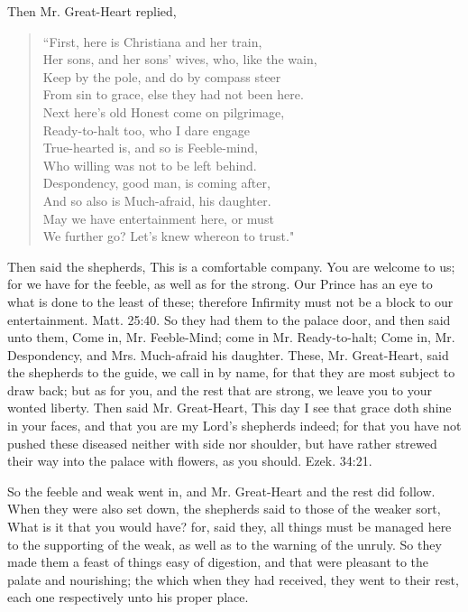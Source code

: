 Then Mr. Great-Heart replied,
\begin{verse}
``First, here is Christiana and her train,\\
Her sons, and her sons' wives, who, like the wain,\\
Keep by the pole, and do by compass steer\\
From sin to grace, else they had not been here.\\
Next here's old Honest come on pilgrimage,\\
Ready-to-halt too, who I dare engage\\
True-hearted is, and so is Feeble-mind,\\
Who willing was not to be left behind.\\
Despondency, good man, is coming after,\\
And so also is Much-afraid, his daughter.\\
May we have entertainment here, or must\\
We further go? Let's knew whereon to trust."\\
\end{verse}

Then said the shepherds, This is a comfortable company. You are welcome to us; for we have for the feeble, as well as for the strong. Our Prince has an eye to what is done to the least of these; therefore Infirmity must not be a block to our entertainment. Matt. 25:40. So they had them to the palace door, and then said unto them, Come in, Mr. Feeble-Mind; come in Mr. Ready-to-halt; Come in, Mr. Despondency, and Mrs. Much-afraid his daughter. These, Mr. Great-Heart, said the shepherds to the guide, we call in by name, for that they are most subject to draw back; but as for you, and the rest that are strong, we leave you to your wonted liberty. Then said Mr. Great-Heart, This day I see that grace doth shine in your faces, and that you are my Lord's shepherds indeed; for that you have not pushed these diseased neither with side nor shoulder, but have rather strewed their way into the palace with flowers, as you should. Ezek. 34:21.

So the feeble and weak went in, and Mr. Great-Heart and the rest did follow. When they were also set down, the shepherds said to those of the weaker sort, What is it that you would have? for, said they, all things must be managed here to the supporting of the weak, as well as to the warning of the unruly. So they made them a feast of things easy of digestion, and that were pleasant to the palate and nourishing; the which when they had received, they went to their rest, each one respectively unto his proper place.


